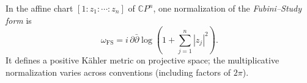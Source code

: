 
In the affine chart $[1:z_1:\cdots:z_n]$ of $\mathbb CP^n$, one normalization of the \emph{Fubini–Study form} is
\[
\omega_{\mathrm{FS}}=i\,\partial\bar\partial\log\left(1+\sum_{j=1}^n|z_j|^2\right).
\]
It defines a positive Kähler metric on projective space; the multiplicative normalization varies across conventions (including factors of $2\pi$).
